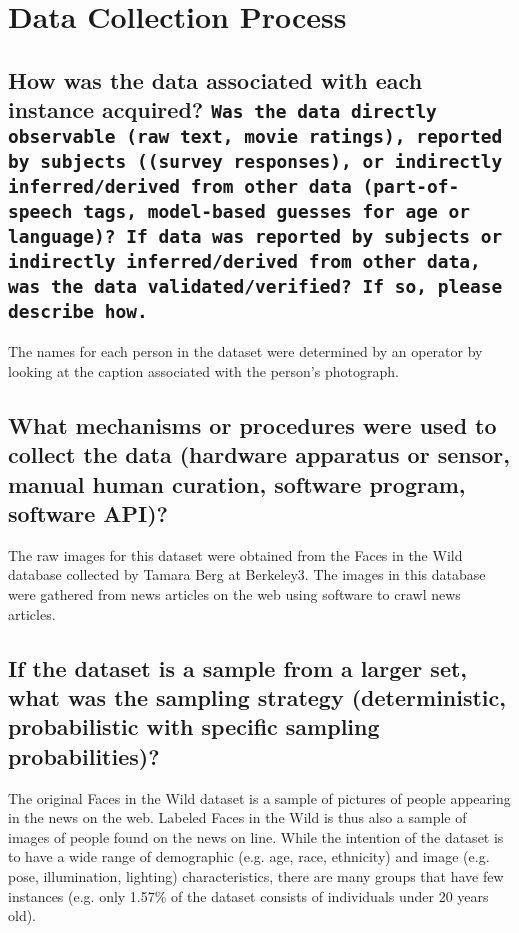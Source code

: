 \section*{Data Collection Process}

\subsection*{How was the data associated with each instance acquired? \texttt{Was the data directly observable (\eg raw text, movie ratings), reported by subjects ((\eg survey responses), or indirectly inferred/derived from other data (\eg part-of-speech tags, model-based guesses for age or language)? If data was reported by subjects or indirectly inferred/derived from other data, was the data validated/verified? If so, please describe how.}}

\noindent The names for each person in the dataset were determined by an
operator by looking at the caption associated with the person’s
photograph.

\subsection*{What mechanisms or procedures were used to collect the data (\eg hardware apparatus or sensor, manual human curation, software program, software API)?}
\noindent The raw images for this dataset were obtained from the Faces in
the Wild database collected by Tamara Berg at Berkeley3. The images in this database were gathered from news articles on the web using software to crawl news articles.


\subsection*{If the dataset is a sample from a larger set, what was the sampling strategy (\eg deterministic, probabilistic with specific sampling probabilities)?}

\noindent The original Faces in the Wild dataset is a sample of pictures of people appearing in the news on the web. Labeled Faces in the
Wild is thus also a sample of images of people found on the news
on line. While the intention of the dataset is to have a wide range
of demographic (e.g. age, race, ethnicity) and image (e.g. pose,
illumination, lighting) characteristics, there are many groups that
have few instances (e.g. only 1.57\% of the dataset consists of
individuals under 20 years old).

